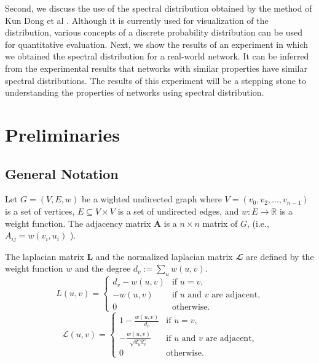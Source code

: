 \documentclass[senior,final,11pt]{iscs-thesis}
\begin{document}
Second, we discuss the use of the spectral distribution obtained by the method of Kun Dong et al \cite{dong2019network}. Although it is currently used for visualization of the distribution, various concepts of a discrete probability distribution can be used for quantitative evaluation. Next, we show the results of an experiment in which we obtained the spectral distribution for a real-world network. It can be inferred from the experimental results that networks with similar properties have similar spectral distributions. The results of this experiment will be a stepping stone to understanding the properties of networks using spectral distribution.

\chapter{Preliminaries}
\section{General Notation}

Let $G=(V,E,w)$ be a wighted undirected graph where $V=(v_0, v_2, ..., v_{n-1})$ is a set of vertices, $E \subseteq V\times V$ is a set of undirected edges, and $w: E \rightarrow \mathbb{R}$ is a weight function. The adjacency matrix ${\mathbf A}$ is a $n \times n$ matrix of $G$, (i.e., $ A_{ij}= w(v_i ,u_i)$ ).

The laplacian matrix ${\mathbf L}$ and the normalized laplacian matrix ${\mathbfcal L}$ are defined by the weight function $w$ and the degree $d_v:=\sum_{u} w(u,v)$.
\[
    L(u,v) = \begin{cases}
        d_v - w(u,v) & \text{if $u=v$}, \\
        - w(u,v) &  \text{if $u$ and $v$ are adjacent,} \\
        0   & \text{otherwise.}
        \end{cases}
\]
\[
    \mathcal{L}(u,v) = \begin{cases}
        1 - \frac{w(u,v)}{d_v} & \text{if $u=v$}, \\
        - \frac{w(u,v)}{\sqrt{d_u d_v}} &  \text{if $u$ and $v$ are adjacent,} \\
        0   & \text{otherwise.}
        \end{cases}
\]
\end{document}
